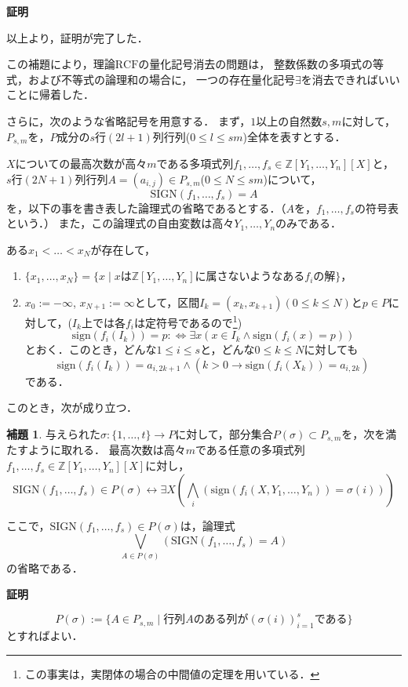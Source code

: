 \documentclass[uplatex, dvipdfmx]{jsarticle}
\makeatletter
\renewenvironment{proof}[1][\proofname]{\par
  \pushQED{\qed}%
  \normalfont \topsep6\p@\@plus6\p@\relax
  \trivlist
  \item\relax
  {\bfseries
  #1\@addpunct{.}}\hspace\labelsep\ignorespaces
}{%
  \popQED\endtrivlist\@endpefalse
}
\newcommand{\Z}{\mathbb{Z}}
\newcommand{\defiff}{ :\Leftrightarrow}
\newcommand{\RCF}{\mathrm{RCF}}
\newcommand{\sign}{\mathrm{sign}}
\newcommand{\SIGN}{\mathrm{SIGN}}
\newcommand{\map}[3]{{#1}:{#2}\rightarrow{#3}}
\theoremstyle{definition}
\newtheorem{lemma}{補題}[section]
\renewcommand{\proofname}{\textbf{証明}}
\makeatother
\begin{document}
\begin{proof}
     以上より，証明が完了した．
\end{proof}

この補題により，理論$\RCF$の量化記号消去の問題は，
整数係数の多項式の等式，および不等式の論理和の場合に，
一つの存在量化記号$\exists$を消去できればいいことに帰着した．

さらに，次のような省略記号を用意する．
まず，$1$以上の自然数$s, m$に対して，$P_{s,m}$を，$P$成分の$s$行$(2l+1)$列行列($0 \leq l \leq sm$)全体を表すとする．

$X$についての最高次数が高々$m$である多項式列$f_1, \dots, f_s \in \Z[Y_1, \dots, Y_n][X]$と，
$s$行$(2N+1)$列行列$A = (a_{i,j}) \in P_{s, m}$($0 \leq N \leq sm$)について，
\[
     \SIGN(f_1, \dots, f_s) = A
\]
を，以下の事を書き表した論理式の省略であるとする．（$A$を，$f_1, \dots, f_s$の符号表という．）
また，この論理式の自由変数は高々$Y_1, \dots, Y_n$のみである．

ある$x_1<\dots<x_N$が存在して，
\begin{enumerate}
    \item $\{x_1, \dots, x_N\} = \{x \mid \text{$x$は$\Z[Y_1, \dots, Y_n]$に属さないようなある$f_i$の解}\}$，
    \item $x_0 := -\infty$, $x_{N+1} := \infty$として，区間$I_k = (x_k, x_{k+1}) (0 \leq k \leq N)$と$p \in P$に対して，($I_k$上では各$f_i$は定符号であるので\footnote{この事実は，実閉体の場合の中間値の定理を用いている．})
    \[
          \sign(f_i(I_k))=p \defiff \exists x (x \in I_k \land \sign(f_i(x) = p))
    \]
    とおく．このとき，どんな$1 \leq i \leq s$と，どんな$0 \leq k \leq N$に対しても
    \[
          \sign(f_i(I_k))=a_{i,2k+1} \land (k>0 \rightarrow \sign(f_i(X_k))=a_{i,2k})
    \]
    である．
\end{enumerate}

このとき，次が成り立つ．
\begin{lemma}\label{lemma:qe_1ststep}
     与えられた$\map{\sigma}{\{1, \dots, t\}}{P}$に対して，部分集合$P(\sigma) \subset P_{s,m}$を，次を満たすように取れる．
     最高次数は高々$m$である任意の多項式列$f_1, \dots, f_s \in \Z[Y_1, \dots, Y_n][X]$に対し，
     \[
          \SIGN(f_1, \dots, f_s) \in P(\sigma) \leftrightarrow \exists X(\bigwedge_i(\sign(f_i(X, Y_1, \dots, Y_n)) = \sigma(i)))
     \]

     ここで，$\SIGN(f_1, \dots, f_s) \in P(\sigma)$は，論理式
     \[
          \bigvee_{A \in P(\sigma)} (\SIGN(f_1, \dots, f_s) = A)
     \]
     の省略である．
\end{lemma}

\begin{proof}
     \[
          P(\sigma):=\{A \in P_{s,m} \mid \text{行列$A$のある列が$(\sigma(i))_{i=1}^s$である}\}
     \]
     とすればよい．
\end{proof}
\end{document}

